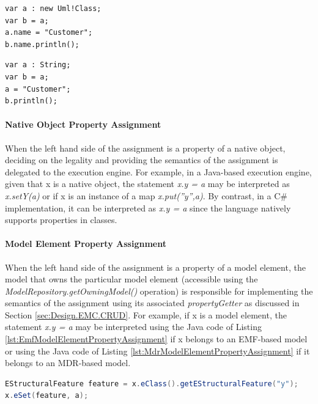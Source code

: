 \begin{lstlisting}[float=bp, caption=Assigning the value of a variable by reference, label=lst:VariableAssignmentByReference, language=EOL]
var a : new Uml!Class;
var b = a;
a.name = "Customer";
b.name.println();
\end{lstlisting}

\begin{lstlisting}[float=bp, caption=Assigning the value of a variable by value, label=lst:VariableAssignmentByValue, language=EOL]
var a : String;
var b = a;
a = "Customer";
b.println();
\end{lstlisting}

\paragraph{Native Object Property Assignment}

When the left hand side of the assignment is a property of a native object, deciding on the legality and providing the semantics of the assignment is delegated to the execution engine. For example, in a Java-based execution engine, given that x is a native object, the statement \emph{x.y = a} may be interpreted as \emph{x.setY(a)} or if x is an instance of a map \emph{x.put(''y'',a)}. By contrast, in a C\# implementation, it can be interpreted as \emph{x.y = a} since
the language natively supports properties in classes.

\paragraph{Model Element Property Assignment}

When the left hand side of the assignment is a property of a model element, the model that owns the particular model element (accessible using the \emph{ModelRepository.getOwningModel() }operation) is responsible for implementing the semantics of the assignment using its associated \emph{propertyGetter} as discussed in Section \ref{sec:Design.EMC.CRUD}. For example, if x is a model element, the statement \emph{x.y = a} may be interpreted using the Java code of Listing \ref{lst:EmfModelElementPropertyAssignment} if x belongs to an EMF-based model or using the Java code of Listing \ref{lst:MdrModelElementPropertyAssignment} if it belongs to an MDR-based model.

\begin{lstlisting}[float=h, caption=Java code that assigns the value of a property of a model element that belongs to an EMF-based model, label=lst:EmfModelElementPropertyAssignment, language=Java]
EStructuralFeature feature = x.eClass().getEStructuralFeature("y");
x.eSet(feature, a);
\end{lstlisting}

